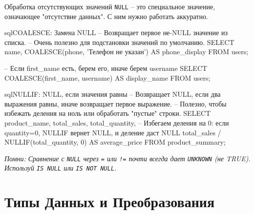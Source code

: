 \begin{myblock}{Обработка отсутствующих значений}
    \texttt{NULL} – это специальное значение, означающее "отсутствие данных". С ним нужно работать аккуратно.
    \begin{codebox}{sql}{COALESCE: Замена NULL}
    -- Возвращает первое не-NULL значение из списка.
    -- Очень полезно для подстановки значений по умолчанию.
    SELECT
        name,
        COALESCE(phone, 'Телефон не указан') AS phone_display
    FROM users;

    -- Если first_name есть, берем его, иначе берем username
    SELECT COALESCE(first_name, username) AS display_name FROM users;
    \end{codebox}
    \begin{codebox}{sql}{NULLIF: NULL, если значения равны}
    -- Возвращает NULL, если два выражения равны, иначе возвращает первое выражение.
    -- Полезно, чтобы избежать деления на ноль или обработать "пустые" строки.
    SELECT
        product_name,
        total_sales,
        total_quantity,
        -- Избегаем деления на 0: если quantity=0, NULLIF вернет NULL, и деление даст NULL
        total_sales / NULLIF(total_quantity, 0) AS average_price
    FROM product_summary;
    \end{codebox}
    \textit{Помни: Сравнение с \texttt{NULL} через \texttt{=} или \texttt{!=} почти всегда дает \texttt{UNKNOWN} (не TRUE). Используй \texttt{IS NULL} или \texttt{IS NOT NULL}.}
\end{myblock}

\section{Типы Данных и Преобразования}

